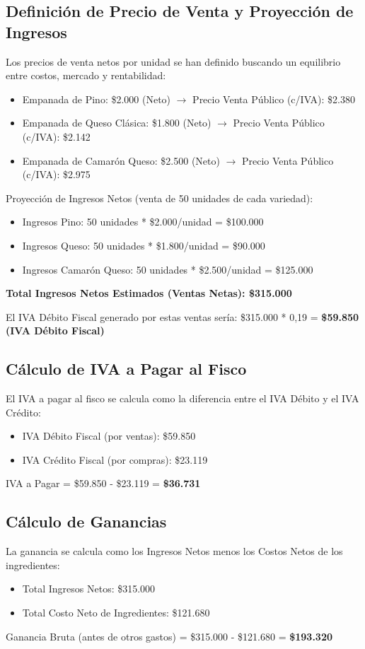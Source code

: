 \documentclass[12pt]{article}
\begin{document}
\subsection{Definición de Precio de Venta y Proyección de Ingresos}
Los precios de venta netos por unidad se han definido buscando un equilibrio entre costos, mercado y rentabilidad:
\begin{itemize}
    \item Empanada de Pino: \$2.000 (Neto) $\rightarrow$ Precio Venta Público (c/IVA): \$2.380
    \item Empanada de Queso Clásica: \$1.800 (Neto) $\rightarrow$ Precio Venta Público (c/IVA): \$2.142
    \item Empanada de Camarón Queso: \$2.500 (Neto) $\rightarrow$ Precio Venta Público (c/IVA): \$2.975
\end{itemize}

Proyección de Ingresos Netos (venta de 50 unidades de cada variedad):
\begin{itemize}
    \item Ingresos Pino: 50 unidades * \$2.000/unidad = \$100.000
    \item Ingresos Queso: 50 unidades * \$1.800/unidad = \$90.000
    \item Ingresos Camarón Queso: 50 unidades * \$2.500/unidad = \$125.000
\end{itemize}
\textbf{Total Ingresos Netos Estimados (Ventas Netas): \$315.000}

El IVA Débito Fiscal generado por estas ventas sería:
\$315.000 * 0,19 = \textbf{\$59.850 (IVA Débito Fiscal)}

\subsection{Cálculo de IVA a Pagar al Fisco}
El IVA a pagar al fisco se calcula como la diferencia entre el IVA Débito y el IVA Crédito:
\begin{itemize}
    \item IVA Débito Fiscal (por ventas): \$59.850
    \item IVA Crédito Fiscal (por compras): \$23.119
\end{itemize}
IVA a Pagar = \$59.850 - \$23.119 = \textbf{\$36.731}

\subsection{Cálculo de Ganancias}
La ganancia se calcula como los Ingresos Netos menos los Costos Netos de los ingredientes:
\begin{itemize}
    \item Total Ingresos Netos: \$315.000
    \item Total Costo Neto de Ingredientes: \$121.680
\end{itemize}
Ganancia Bruta (antes de otros gastos) = \$315.000 - \$121.680 = \textbf{\$193.320}
\end{document}
